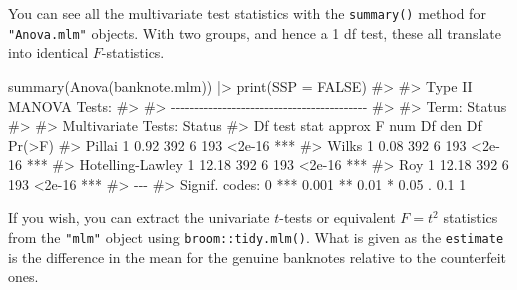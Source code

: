 \documentclass[
  letterpaper,
  10pt,
  krantz2]{krantz}
\makeatletter
\newenvironment{Shaded}{\begin{snugshade}}{\end{snugshade}}
\newcommand{\AttributeTok}[1]{\textcolor[rgb]{0.40,0.45,0.13}{#1}}
\newcommand{\CommentTok}[1]{\textcolor[rgb]{0.37,0.37,0.37}{#1}}
\newcommand{\ConstantTok}[1]{\textcolor[rgb]{0.56,0.35,0.01}{#1}}
\newcommand{\FunctionTok}[1]{\textcolor[rgb]{0.28,0.35,0.67}{#1}}
\newcommand{\NormalTok}[1]{\textcolor[rgb]{0.00,0.23,0.31}{#1}}
\newcommand{\SpecialCharTok}[1]{\textcolor[rgb]{0.37,0.37,0.37}{#1}}
\newenvironment{kframe}{%
  \medskip{}
  \setlength{\fboxsep}{.8em}
  \def\at@end@of@kframe{}%
  \ifinner\ifhmode%
  \def\at@end@of@kframe{\end{minipage}}%
  \begin{minipage}{\columnwidth}%
  \fi\fi%
  \def\FrameCommand##1{\hskip\@totalleftmargin \hskip-\fboxsep
  \colorbox{shadecolor}{##1}\hskip-\fboxsep
      \hskip-\linewidth \hskip-\@totalleftmargin \hskip\columnwidth}%
  \MakeFramed {\advance\hsize-\width
    \@totalleftmargin\z@ \linewidth\hsize
    \@setminipage}}%
{\par\unskip\endMakeFramed%
  \at@end@of@kframe}
\renewenvironment{Shaded}{\begin{kframe}}{\end{kframe}}
\makeatother
\begin{document}
You can see all the multivariate test statistics with the
\texttt{summary()} method for \texttt{"Anova.mlm"} objects. With two
groups, and hence a 1 df test, these all translate into identical
\(F\)-statistics.

\begin{Shaded}
\begin{Highlighting}[]
\FunctionTok{summary}\NormalTok{(}\FunctionTok{Anova}\NormalTok{(banknote.mlm)) }\SpecialCharTok{|\textgreater{}} \FunctionTok{print}\NormalTok{(}\AttributeTok{SSP =} \ConstantTok{FALSE}\NormalTok{)}
\CommentTok{\#\textgreater{} }
\CommentTok{\#\textgreater{} Type II MANOVA Tests:}
\CommentTok{\#\textgreater{} }
\CommentTok{\#\textgreater{} {-}{-}{-}{-}{-}{-}{-}{-}{-}{-}{-}{-}{-}{-}{-}{-}{-}{-}{-}{-}{-}{-}{-}{-}{-}{-}{-}{-}{-}{-}{-}{-}{-}{-}{-}{-}{-}{-}{-}{-}{-}{-}}
\CommentTok{\#\textgreater{}  }
\CommentTok{\#\textgreater{} Term: Status }
\CommentTok{\#\textgreater{} }
\CommentTok{\#\textgreater{} Multivariate Tests: Status}
\CommentTok{\#\textgreater{}                  Df test stat approx F num Df den Df Pr(\textgreater{}F)    }
\CommentTok{\#\textgreater{} Pillai            1      0.92      392      6    193 \textless{}2e{-}16 ***}
\CommentTok{\#\textgreater{} Wilks             1      0.08      392      6    193 \textless{}2e{-}16 ***}
\CommentTok{\#\textgreater{} Hotelling{-}Lawley  1     12.18      392      6    193 \textless{}2e{-}16 ***}
\CommentTok{\#\textgreater{} Roy               1     12.18      392      6    193 \textless{}2e{-}16 ***}
\CommentTok{\#\textgreater{} {-}{-}{-}}
\CommentTok{\#\textgreater{} Signif. codes:  0 \textquotesingle{}***\textquotesingle{} 0.001 \textquotesingle{}**\textquotesingle{} 0.01 \textquotesingle{}*\textquotesingle{} 0.05 \textquotesingle{}.\textquotesingle{} 0.1 \textquotesingle{} \textquotesingle{} 1}
\end{Highlighting}
\end{Shaded}

If you wish, you can extract the univariate \(t\)-tests or equivalent
\(F = t^2\) statistics from the \texttt{"mlm"} object using
\texttt{broom::tidy.mlm()}. What is given as the \texttt{estimate} is
the difference in the mean for the genuine banknotes relative to the
counterfeit ones.
\end{document}
